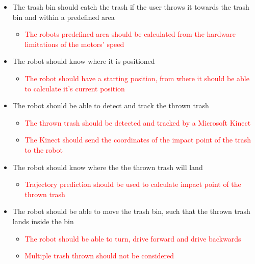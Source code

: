 \begin{itemize}
\item The trash bin should catch the trash if the user throws it towards the trash bin and within a predefined area
\begin{itemize}
\item \textcolor{red}{The robots predefined area should be calculated from the hardware limitations of the motors’ speed}
\end{itemize}
\item The robot should know where it is positioned
\begin{itemize}
\item \textcolor{red}{The robot should have a starting position, from where it should be able to calculate it's current position }
\end{itemize}
\item The robot should be able to detect and track the thrown trash
\begin{itemize}
\item \textcolor{red}{The thrown trash should be detected and tracked by a Microsoft Kinect}
\item \textcolor{red}{The Kinect should send the coordinates of the impact point of the trash to the robot}
\end{itemize}
\item The robot should know where the the thrown trash will land
\begin{itemize}
\item \textcolor{red}{Trajectory prediction should be used to calculate impact point of the thrown trash}
\end{itemize}
\item The robot should be able to move the trash bin, such that the thrown trash lands inside the bin
\begin{itemize}
\item \textcolor{red}{The robot should be able to turn, drive forward and drive backwards}
\item \textcolor{red}{Multiple trash thrown should not be considered}
\end{itemize}
\end{itemize}